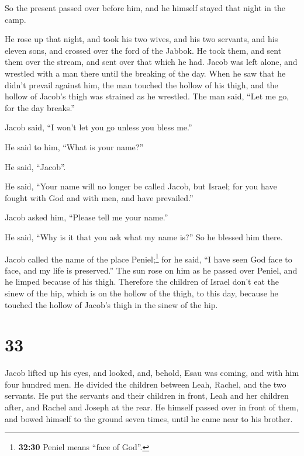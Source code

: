  So the present passed over before him, and he himself
stayed that night in the camp.

 He rose up that night, and took his two wives, and his
two servants, and his eleven sons, and crossed over the ford of the
Jabbok.  He took them, and sent them over the stream, and
sent over that which he had.  Jacob was left alone, and
wrestled with a man there until the breaking of the day. 
When he saw that he didn't prevail against him, the man touched the
hollow of his thigh, and the hollow of Jacob's thigh was strained as he
wrestled.  The man said, ``Let me go, for the day
breaks.''

Jacob said, ``I won't let you go unless you bless me.''

 He said to him, ``What is your name?''

He said, ``Jacob''.

 He said, ``Your name will no longer be called Jacob, but
Israel; for you have fought with God and with men, and have prevailed.''

 Jacob asked him, ``Please tell me your name.''

He said, ``Why is it that you ask what my name is?'' So he blessed him
there.

 Jacob called the name of the place Peniel;\footnote{\textbf{32:30}
  Peniel means ``face of God''.} for he said, ``I have seen God face to
face, and my life is preserved.''  The sun rose on him as
he passed over Peniel, and he limped because of his thigh.
 Therefore the children of Israel don't eat the sinew of
the hip, which is on the hollow of the thigh, to this day, because he
touched the hollow of Jacob's thigh in the sinew of the hip.

\hypertarget{section-32}{%
\section{33}\label{section-32}}

 Jacob lifted up his eyes, and looked, and, behold, Esau
was coming, and with him four hundred men. He divided the children
between Leah, Rachel, and the two servants.  He put the
servants and their children in front, Leah and her children after, and
Rachel and Joseph at the rear.  He himself passed over in
front of them, and bowed himself to the ground seven times, until he
came near to his brother.


